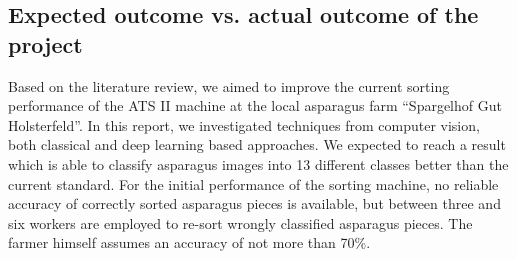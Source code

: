 \subsection{Expected outcome vs. actual outcome of the project}
\label{sec:ExpectedvsActual}

Based on the literature review, we aimed to improve the current sorting performance of the ATS II machine at the local asparagus farm “Spargelhof Gut Holsterfeld”. In this report, we investigated techniques from computer vision, both classical and deep learning based approaches. We expected to reach a result which is able to classify asparagus images into 13 different classes better than the current standard. For the initial performance of the sorting machine, no reliable accuracy of correctly sorted asparagus pieces is available, but between three and six workers are employed to re-sort wrongly classified asparagus pieces. The farmer himself assumes an accuracy of not more than 70\%. \\
 
